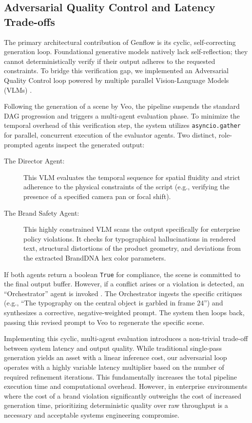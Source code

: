 \documentclass[sigconf,authordraft]{acmart}
\begin{document}
\subsection{Adversarial Quality Control and Latency Trade-offs}

The primary architectural contribution of Genflow is its cyclic, self-correcting generation loop. Foundational generative models natively lack self-reflection; they cannot deterministically verify if their output adheres to the requested constraints. To bridge this verification gap, we implemented an Adversarial Quality Control loop powered by multiple parallel Vision-Language Models (VLMs) \cite{deepmind2024advanced}.

Following the generation of a scene by Veo, the pipeline suspends the standard DAG progression and triggers a multi-agent evaluation phase. To minimize the temporal overhead of this verification step, the system utilizes \texttt{asyncio.gather} for parallel, concurrent execution of the evaluator agents. Two distinct, role-prompted agents inspect the generated output:

\begin{description}
    \item[The Director Agent:] This VLM evaluates the temporal sequence for spatial fluidity and strict adherence to the physical constraints of the script (e.g., verifying the presence of a specified camera pan or focal shift).
    \item[The Brand Safety Agent:] This highly constrained VLM scans the output specifically for enterprise policy violations. It checks for typographical hallucinations in rendered text, structural distortions of the product geometry, and deviations from the extracted BrandDNA hex color parameters.
\end{description}

If both agents return a boolean \texttt{True} for compliance, the scene is committed to the final output buffer. However, if a conflict arises or a violation is detected, an ``Orchestrator'' agent is invoked \cite{liu2024visual}. The Orchestrator ingests the specific critiques (e.g., ``The typography on the central object is garbled in frame 24'') and synthesizes a corrective, negative-weighted prompt. The system then loops back, passing this revised prompt to Veo to regenerate the specific scene.

Implementing this cyclic, multi-agent evaluation introduces a non-trivial trade-off between system latency and output quality. While traditional single-pass generation yields an asset with a linear inference cost, our adversarial loop operates with a highly variable latency multiplier based on the number of required refinement iterations. This fundamentally increases the total pipeline execution time and computational overhead. However, in enterprise environments where the cost of a brand violation significantly outweighs the cost of increased generation time, prioritizing deterministic quality over raw throughput is a necessary and acceptable systems engineering compromise.
\end{document}
